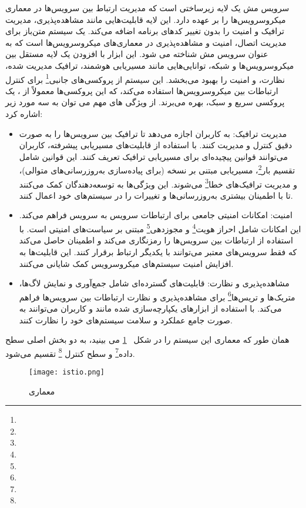  سرویس مش یک لایه زیرساختی است که مدیریت ارتباط بین سرویس‌ها در معماری میکروسرویس‌ها را بر عهده دارد. این لایه قابلیت‌هایی مانند مشاهده‌پذیری، مدیریت ترافیک و امنیت را بدون تغییر کدهای برنامه اضافه می‌کند.  یک سیستم متن‌باز برای مدیریت اتصال، امنیت و مشاهده‌پذیری در معماری‌های میکروسرویس‌ها است که به عنوان سرویس مش شناخته می شود. این ابزار با افزودن یک لایه مستقل بین میکروسرویس‌ها و شبکه، توانایی‌هایی مانند مسیریابی هوشمند، ترافیک مدیریت شده، نظارت، و امنیت را بهبود می‌بخشد. این سیستم از پروکسی‌های جانبی\footnote{} برای کنترل ارتباطات بین میکروسرویس‌ها استفاده می‌کند، که این پروکسی‌ها معمولاً از ، یک پروکسی سریع و سبک، بهره می‌برند. از ویژگی های مهم  می توان به سه مورد زیر اشاره کرد:
\begin{itemize}
	\item 
مدیریت ترافیک:
 به کاربران اجازه می‌دهد تا ترافیک بین سرویس‌ها را به صورت دقیق کنترل و مدیریت کنند. با استفاده از قابلیت‌های مسیریابی پیشرفته، کاربران می‌توانند قوانین پیچیده‌ای برای مسیریابی ترافیک تعریف کنند. این قوانین شامل تقسیم بار\footnote{}، مسیریابی مبتنی بر نسخه (برای پیاده‌سازی به‌روزرسانی‌های متوالی)، و مدیریت ترافیک‌های خطا\footnote{} می‌شوند. این ویژگی‌ها به توسعه‌دهندگان کمک می‌کنند تا با اطمینان بیشتری به‌روزرسانی‌ها و تغییرات را در سیستم‌های خود اعمال کنند.
 	\item 
 	امنیت:
 	امکانات امنیتی جامعی برای ارتباطات سرویس به سرویس فراهم می‌کند. این امکانات شامل احراز هویت\footnote{} و مجوزدهی\footnote{} مبتنی بر سیاست‌های امنیتی است.  با استفاده از  ارتباطات بین سرویس‌ها را رمزنگاری می‌کند و اطمینان حاصل می‌کند که فقط سرویس‌های معتبر می‌توانند با یکدیگر ارتباط برقرار کنند. این قابلیت‌ها به افزایش امنیت سیستم‌های میکروسرویس کمک شایانی می‌کنند.
 	\item
مشاهده‌پذیری و نظارت:
 قابلیت‌های گسترده‌ای شامل جمع‌آوری و نمایش لاگ‌ها، متریک‌ها و تریس‌ها\footnote{} برای مشاهده‌پذیری و نظارت ارتباطات بین سرویس‌ها فراهم می‌کند. با استفاده از ابزارهای یکپارچه‌سازی شده مانند  و   کاربران می‌توانند به صورت جامع عملکرد و سلامت سیستم‌های خود را نظارت کنند.
 	
\end{itemize} 
 
 همان طور که معماری این سیستم را در شکل 
~\ref{fig: istio arch}
 می بینید،  به دو بخش اصلی سطح داده\footnote{} و سطح کنترل \footnote{} تقسیم می‌شود.
 
\begin{figure}[t]
	\centering
	\texttt{[image: istio.png]}
	\caption{معماری }
	\label{fig: istio arch}
\end{figure}
